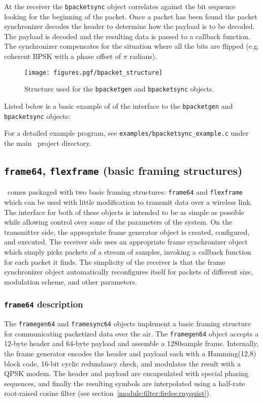 At the receiver
the {\tt bpacketsync} object correlates against the bit sequence looking
for the beginning of the packet.
Once a packet has been found the packet synchronizer decodes the header
to determine how the payload is to be decoded.
The payload is decoded and the resulting data is passed to a callback
function.
The synchronizer compensates for the situation where all the bits are
flipped (e.g. coherent BPSK with a phase offset of $\pi$ radians).
%

% 
%
\begin{figure}
\centering
  \texttt{[image: figures.pgf/bpacket\_structure]}
\caption{
    Structure used for the {\tt bpacketgen} and
    {\tt bpacketsync} objects.}
\label{fig:module:framing:bpacket_structure}
\end{figure}

Listed below is a basic example of of the interface to the
{\tt bpacketgen} and
{\tt bpacketsync} objects:
%

%
For a detailed example program, see
{\tt examples/bpacketsync\_example.c} under the main \liquid\ project
directory.


\subsection{{\tt frame64}, {\tt flexframe} (basic framing structures)}
\label{module:framing:frames}
\liquid\ comes packaged with two basic framing structures: {\tt frame64} and
{\tt flexframe} which can be used with little modification to transmit data
over a wireless link.
The interface for both of these objects is intended to be as simple as
possible while allowing control over some of the parameters of the system.
On the transmitter side, the appropriate frame generator object is created,
configured, and executed.
The receiver side uses an appropriate frame synchronizer object which simply
picks packets of a stream of samples, invoking a callback function for each
packet it finds.
The simplicity of the receiver is that the frame synchronizer object
automatically reconfigures itself for packets of different size, modulation
scheme, and other parameters.

\subsubsection{{\tt frame64} description}
\label{module:framing:frames:frame64}
The {\tt framegen64} and {\tt framesync64} objects implement a basic framing
structure for communicating packetized data over the air.
The {\tt framegen64} object accepts a 12-byte header and 64-byte payload and
assemble a 1280sample frame.
Internally, the frame generator encodes the header and payload each with a
Hamming(12,8) block code, 16-bit cyclic redundancy check, and modulates the
result with a QPSK modem.
The header and payload are encapsulated with special phasing sequences, and
finally the resulting symbols are interpolated using a half-rate root-raised
cosine filter (see section~\ref{module:filter:firdes:rnyquist}).

